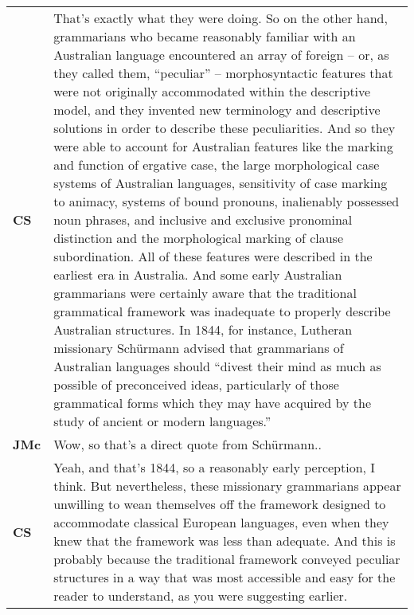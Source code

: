 \documentclass[12pt]{article}
\begin{document}
\begin{flushleft}
\begin{supertabular}{m{0.24415985in}m{5.89766in}}
\textbf{CS}\newline
 &
That’s exactly what they were doing. So on the other hand, grammarians who became reasonably familiar with an Australian language encountered an array of foreign – or, as they called them, “peculiar” – morphosyntactic features that were not originally accommodated within the descriptive model, and they invented new terminology and descriptive solutions in order to describe these peculiarities. And so they were able to account for Australian features like the marking and function of ergative case, the large morphological case systems of Australian languages, sensitivity of case marking to animacy, systems of bound pronouns, inalienably possessed noun phrases, and inclusive and exclusive pronominal distinction and the morphological marking of clause subordination. All of these features were described in the earliest era in Australia. And some early Australian grammarians were certainly aware that the traditional grammatical framework was inadequate to properly describe Australian structures. In 1844, for instance, Lutheran missionary Schürmann advised that grammarians of Australian languages should “divest their mind as much as possible of preconceived ideas, particularly of those grammatical forms which they may have acquired by the study of ancient or modern languages.”\\
\textbf{JMc}\newline
 &
Wow, so that’s a direct quote from Schürmann..\\
\textbf{CS}\newline
 &
Yeah, and that’s 1844, so a reasonably early perception, I think. But nevertheless, these missionary grammarians appear unwilling to wean themselves off the framework designed to accommodate classical European languages, even when they knew that the framework was less than adequate. And this is probably because the traditional framework conveyed peculiar structures in a way that was most accessible and easy for the reader to understand, as you were suggesting earlier.


\end{supertabular}
\end{flushleft}
\end{document}
